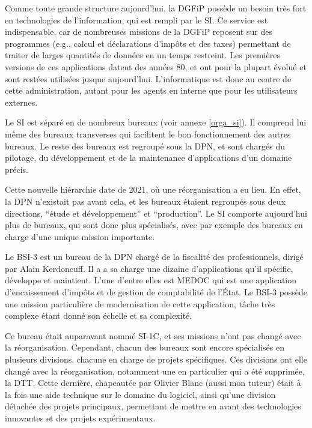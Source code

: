 \documentclass[openany, 11pt]{memoir}
\begin{document}
\bigskip

Comme toute grande structure aujourd'hui, la \gls{DGFiP} possède un besoin très fort en technologies de l'information, qui est rempli par le \gls{SI}. Ce service est indispensable, car de nombreuses missions de la DGFiP reposent sur des programmes (e.g., calcul et déclarations d'impôts et des taxes) permettant de traiter de larges quantités de données en un temps restreint. Les premières versions de ces applications datent des années 80, et ont pour la plupart évolué et sont restées utilisées jusque aujourd'hui. L'informatique est donc au centre de cette administration, autant pour les agents en interne que pour les utilisateurs externes.

Le \gls{SI} est séparé en de nombreux bureaux (voir annexe \ref{orga_si}). Il comprend lui même des bureaux \glspl{transverse} qui facilitent le bon fonctionnement des autres bureaux. Le reste des bureaux est regroupé sous la \gls{DPN}, et sont chargés du pilotage, du développement et de la maintenance d'applications d'un domaine précis.

Cette nouvelle hiérarchie date de 2021, où une réorganisation a eu lieu. En effet, la \gls{DPN} n'existait pas avant cela, et les bureaux étaient regroupés sous deux directions, ``étude et développement'' et ``production''. Le \gls{SI} comporte aujourd'hui plus de bureaux, qui sont donc plus spécialisés, avec par exemple des bureaux en charge d'une unique mission importante.

\bigskip

Le \gls{BSI-3} est un bureau de la \gls{DPN} chargé de la fiscalité des professionnels, dirigé par Alain Kerdoncuff. Il a a sa charge une dizaine d'applications qu'il spécifie, développe et maintient. L'une d'entre elles est \gls{MEDOC} qui est une application d'encaissement d'impôts et de gestion de comptabilité de l'État. Le \gls{BSI-3} possède une mission particulière de modernisation de cette application, tâche très complexe étant donné son échelle et sa complexité.

Ce bureau était auparavant nommé SI-1C, et ses missions n'ont pas changé avec la réorganisation. Cependant, chacun des bureaux sont encore spécialisés en plusieurs divisions, chacune en charge de projets spécifiques. Ces divisions ont elle changé avec la réorganisation, notamment une en particulier qui a été supprimée, la \gls{DTT}. Cette dernière, chapeautée par Olivier Blanc (aussi mon tuteur) était à la fois une aide technique sur le domaine du logiciel, ainsi qu'une division détachée des projets principaux, permettant de mettre en avant des technologies innovantes et des projets expérimentaux.
\end{document}
